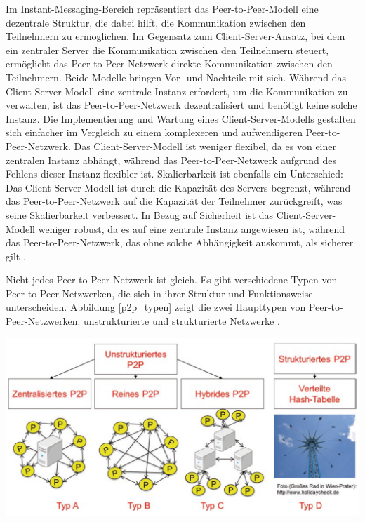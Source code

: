 Im Instant-Messaging-Bereich repräsentiert das Peer-to-Peer-Modell eine dezentrale Struktur, die dabei hilft, die Kommunikation zwischen den Teilnehmern zu ermöglichen. Im Gegensatz zum Client-Server-Ansatz, bei dem ein zentraler Server die Kommunikation zwischen den Teilnehmern steuert, ermöglicht das Peer-to-Peer-Netzwerk direkte Kommunikation zwischen den Teilnehmern. Beide Modelle bringen Vor- und Nachteile mit sich. Während das Client-Server-Modell eine zentrale Instanz erfordert, um die Kommunikation zu verwalten, ist das Peer-to-Peer-Netzwerk dezentralisiert und benötigt keine solche Instanz. Die Implementierung und Wartung eines Client-Server-Modells gestalten sich einfacher im Vergleich zu einem komplexeren und aufwendigeren Peer-to-Peer-Netzwerk. Das Client-Server-Modell ist weniger flexibel, da es von einer zentralen Instanz abhängt, während das Peer-to-Peer-Netzwerk aufgrund des Fehlens dieser Instanz flexibler ist. Skalierbarkeit ist ebenfalls ein Unterschied: Das Client-Server-Modell ist durch die Kapazität des Servers begrenzt, während das Peer-to-Peer-Netzwerk auf die Kapazität der Teilnehmer zurückgreift, was seine Skalierbarkeit verbessert. In Bezug auf Sicherheit ist das Client-Server-Modell weniger robust, da es auf eine zentrale Instanz angewiesen ist, während das Peer-to-Peer-Netzwerk, das ohne solche Abhängigkeit auskommt, als sicherer gilt \parencite[S. 6-8]{Mahlmann_P2PNetzwerke}.

Nicht jedes Peer-to-Peer-Netzwerk ist gleich. Es gibt verschiedene Typen von Peer-to-Peer-Netzwerken, die sich in ihrer Struktur und Funktionsweise unterscheiden. Abbildung \ref{p2p_typen} zeigt die zwei Haupttypen von Peer-to-Peer-Netzwerken: unstrukturierte und strukturierte Netzwerke \parencite[S. 362-363]{Luntovskyy_ModRechnernetze}.

\begin{center}
    \captionsetup{type=figure}
    \includegraphics[width=1\linewidth]{images/peer_to_peer_typen.png}
    \label{p2p_typen}
\end{center}

